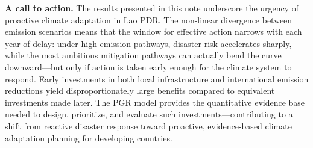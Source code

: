 \documentclass[11pt,a4paper]{article}
\begin{document}
\textbf{A call to action.} The results presented in this note underscore the urgency of proactive climate adaptation in Lao PDR. The non-linear divergence between emission scenarios means that the window for effective action narrows with each year of delay: under high-emission pathways, disaster risk accelerates sharply, while the most ambitious mitigation pathways can actually bend the curve downward---but only if action is taken early enough for the climate system to respond. Early investments in both local infrastructure and international emission reductions yield disproportionately large benefits compared to equivalent investments made later. The PGR model provides the quantitative evidence base needed to design, prioritize, and evaluate such investments---contributing to a shift from reactive disaster response toward proactive, evidence-based climate adaptation planning for developing countries.
\end{document}
